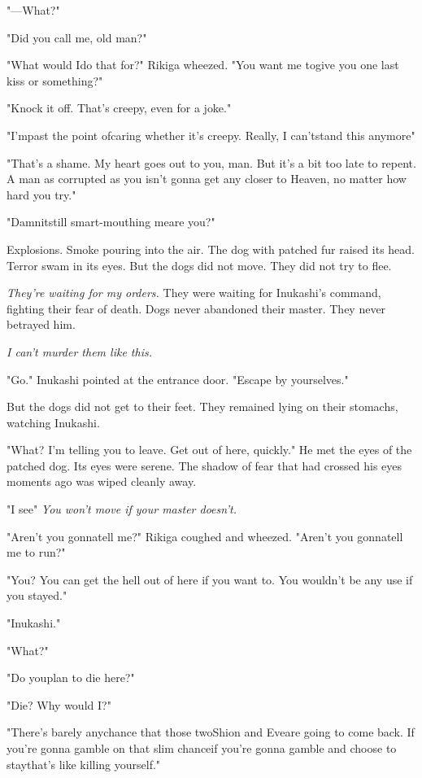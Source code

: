 "---What?"

"Did you call me, old man?"

"What would I\el do that for?" Rikiga wheezed. "You want me to\el give
you one last kiss or something?"

"Knock it off. That's creepy, even for a joke."

"I'm\el past the point of\el caring whether it's creepy. Really, I
can't\el stand this anymore\el "

"That's a shame. My heart goes out to you, man. But it's a bit too late
to repent. A man as corrupted as you isn't gonna get any closer to
Heaven, no matter how hard you try."

"Damnit\el still smart-mouthing me\el are you?"

Explosions. Smoke pouring into the air. The dog with patched fur raised
its head. Terror swam in its eyes. But the dogs did not move. They did
not try to flee.

\emph{They're waiting for my orders.} They were waiting for Inukashi's command,
fighting their fear of death. Dogs never abandoned their master. They
never betrayed him.

\emph{I can't murder them like this.}

"Go." Inukashi pointed at the entrance door. "Escape by yourselves."

But the dogs did not get to their feet. They remained lying on their
stomachs, watching Inukashi.

"What? I'm telling you to leave. Get out of here, quickly." He met the
eyes of the patched dog. Its eyes were serene. The shadow of fear that
had crossed his eyes moments ago was wiped cleanly away.

"I see\el " \emph{You won't move if your master doesn't.}

"Aren't you gonna\el tell me?" Rikiga coughed and wheezed. "Aren't you
gonna\el tell me to run?"

"You? You can get the hell out of here if you want to. You wouldn't be
any use if you stayed."

"Inukashi."

"What?"

"Do you\el plan to die here?"

"Die? Why would I?"

"There's barely any\el chance that those two\el Shion and Eve\el are
going to come back. If you're gonna gamble on that slim chance\el if
you're gonna gamble and choose to stay\el that's like killing yourself."

